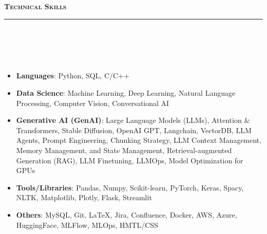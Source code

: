 \documentclass[a4paper,10pt]{article}
\newcommand{\lsep}{-0.5cm}
\newcommand{\resheading}[1]{{\small
        {
            \begin{minipage}
                {0.992\textwidth}\textbf{{\textsc{#1 \vphantom{p\^{E}} }}}
                \\[-0.3cm]
                \hrule
            \end{minipage}
            \\[-0.5cm]
        }
 }}
\begin{document}
\vspace{2pt}
\noindent
\resheading{\textbf{\large Technical Skills}}\\[\lsep] 
\\[-0.3cm]
\begin{itemize}
  \item \textbf{Languages}: Python, SQL, C/C++\\[-0.6cm]
  \item \textbf{Data Science}: Machine Learning, Deep Learning, Natural Language Processing, Computer Vision, Conversational AI  \\[-0.6cm]
  \item \textbf{Generative AI (GenAI)}: Large Language Models (LLMs), Attention \& Transformers, Stable Diffusion, OpenAI GPT, Langchain, VectorDB, LLM Agents, Prompt Engineering, Chunking Strategy, LLM Context Management, \\Memory Management, and State Management, Retrieval-augmented Generation (RAG), LLM Finetuning, LLMOps, Model Optimization for GPUs \\[-0.6cm]
  \item \textbf{Tools/Libraries}: Pandas, Numpy, Scikit-learn, PyTorch, Keras, Spacy, NLTK, Matplotlib, Plotly, Flask, Streamlit \\[-0.6cm]
  \item \textbf{Others}: MySQL, Git, LaTeX, Jira, Confluence, Docker, AWS, Azure, HuggingFace, MLFlow, MLOps, HMTL/CSS\\[-0.5cm]
\end{itemize}

\end{document}
